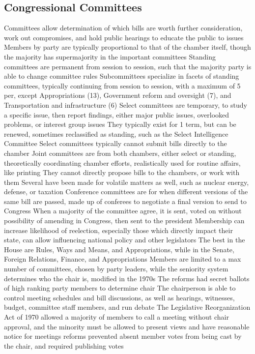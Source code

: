 \documentclass[11 pt, twoside]{article}
\newenvironment{outline*}
{
	\begin{outline}[enumerate]
	}
	{\end{outline}
}
\begin{document}
\subsection{Congressional Committees}
\begin{outline*}
\1 Committees allow determination of which bills are worth further consideration, work out compromises, and hold public hearings to educate the public to issues
\2 Members by party are typically proportional to that of the chamber itself, though the majority has supermajority in the important committees
\1 Standing committees are permanent from session to session, such that the majority party is able to change committee rules
\1 Subcommittees specialize in facets of standing committees, typically continuing from session to session, with a maximum of 5 per, except Appropriations (13), Government reform and oversight (7), and Transportation and infrastructure (6)
\1 Select committees are temporary, to study a specific issue, then report findings, either major public issues, overlooked problems, or interest group issues
\2 They typically exist for 1 term, but can be renewed, sometimes reclassified as standing, such as the Select Intelligence Committee
\2 Select committees typically cannot submit bills directly to the chamber
\1 Joint committees are from both chambers, either select or standing, theoretically coordinating chamber efforts, realistically used for routine affairs, like printing
\2 They cannot directly propose bills to the chambers, or work with them
\2 Several have been made for volatile matters as well, such as nuclear energy, defense, or taxation
\1 Conference committees are for when different versions of the same bill are passed, made up of conferees to negotiate a final version to send to Congress
\2 When a majority of the committee agree, it is sent, voted on without possibility of amending in Congress, then sent to the president
\1 Membership can increase likelihood of reelection, especially those which directly impact their state, can allow influencing national policy and other legislators
\2 The best in the House are Rules, Ways and Means, and Appropriations, while in the Senate, Foreign Relations, Finance, and Appropriations
\1 Members are limited to a max number of committees, chosen by party leaders, while the seniority system determines who the chair is, modified in the 1970s
\2 The reforms had secret ballots of high ranking party members to determine chair
\1 The chairperson is able to control meeting schedules and bill discussions, as well as hearings, witnesses, budget, committee staff members, and run debate
\2 The Legislative Reorganization Act of 1970 allowed a majority of members to call a meeting without chair approval, and the minority must be allowed to present views and have reasonable notice for meetings
 reforms prevented absent member votes from being cast by the chair, and required publishing votes
\end{outline*}
\end{document}
